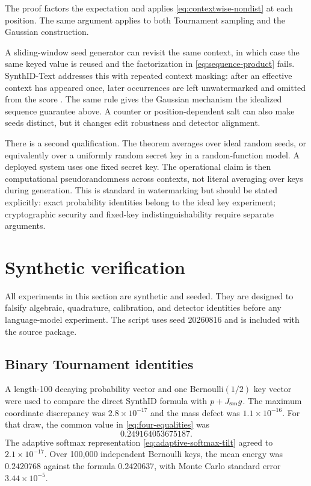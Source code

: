 \documentclass[11pt]{article}
\theoremstyle{definition}
\theoremstyle{remark}
\begin{document}
The proof factors the expectation and applies \eqref{eq:contextwise-nondist} at each position. The same argument applies to both Tournament sampling and the Gaussian construction.

A sliding-window seed generator can revisit the same context, in which case the same keyed value is reused and the factorization in \eqref{eq:sequence-product} fails. SynthID-Text addresses this with repeated context masking: after an effective context has appeared once, later occurrences are left unwatermarked and omitted from the score \citep{dathathri2024synthid}. The same rule gives the Gaussian mechanism the idealized sequence guarantee above. A counter or position-dependent salt can also make seeds distinct, but it changes edit robustness and detector alignment.

There is a second qualification. The theorem averages over ideal random seeds, or equivalently over a uniformly random secret key in a random-function model. A deployed system uses one fixed secret key. The operational claim is then computational pseudorandomness across contexts, not literal averaging over keys during generation. This is standard in watermarking but should be stated explicitly: exact probability identities belong to the ideal key experiment; cryptographic security and fixed-key indistinguishability require separate arguments.

\section{Synthetic verification}
\label{sec:numerical}

All experiments in this section are synthetic and seeded. They are designed to falsify algebraic, quadrature, calibration, and detector identities before any language-model experiment. The script uses seed 20260816 and is included with the source package.

\subsection{Binary Tournament identities}

A length-100 decaying probability vector and one Bernoulli$(1/2)$ key vector were used to compare the direct SynthID formula with $p+J_{\rm sm}g$. The maximum coordinate discrepancy was $2.8\times10^{-17}$ and the mass defect was $1.1\times10^{-16}$. For that draw, the common value in \eqref{eq:four-equalities} was
\begin{equation}
0.249164053675187.
\end{equation}
The adaptive softmax representation \eqref{eq:adaptive-softmax-tilt} agreed to $2.1\times10^{-17}$. Over 100,000 independent Bernoulli keys, the mean energy was $0.2420768$ against the formula $0.2420637$, with Monte Carlo standard error $3.44\times10^{-5}$.
\end{document}
